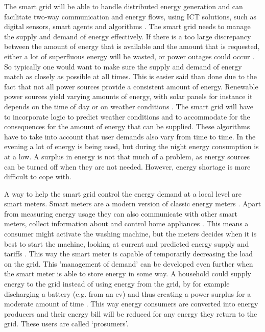 The smart grid will be able to handle distributed energy generation and can facilitate two-way communication and energy flows, using ICT solutions, such as digital sensors, smart agents and algorithms \cite{FangMisraXueYang2012}. The smart grid needs to manage the supply and demand of energy effectively. If there is a too large discrepancy between the amount of energy that is available and the amount that is requested, either a lot of superfluous energy will be wasted, or power outages could occur \cite{FangMisraXueYang2012}. So typically one would want to make sure the supply and demand of energy match as closely as possible at all times. This is easier said than done due to the fact that not all power sources provide a consistent amount of energy. Renewable power sources yield varying amounts of energy, with solar panels for instance it depends on the time of day or on weather conditions \cite{RamchurnVitelingumRogersJennings2014}. The smart grid will have to incorporate logic to predict weather conditions and to accommodate for the consequences for the amount of energy that can be supplied. These algorithms have to take into account that user demands also vary from time to time. In the evening a lot of energy is being used, but during the night energy consumption is at a low. A surplus in energy is not that much of a problem, as energy sources can be turned off when they are not needed. However, energy shortage is more difficult to cope with.

A way to help the smart grid control the energy demand at a local level are smart meters. Smart meters are a modern version of classic energy meters \cite{FangMisraXueYang2012,Wang2011}. Apart from measuring energy usage they can also communicate with other smart meters, collect information about and control home appliances \cite{DepuruWangDevabhaktuni2011a}. This means a consumer might activate the washing machine, but the meters decides when it is best to start the machine, looking at current and predicted energy supply and tariffs  \cite{DepuruWangDevabhaktuni2011a}. This way the smart meter is capable of temporarily decreasing the load on the grid. This 'management of demand' can be developed even further when the smart meter is able to store energy in some way. A household could supply energy to the grid instead of using energy from the grid, by for example discharging a battery (e.g. from an \ac{ev}) and thus creating a power surplus for a moderate amount of time \cite{MwasiluJustoKimEtAl2014}. This way energy consumers are converted into energy producers and their energy bill will be reduced for any energy they return to the grid. These users are called `prosumers'.

